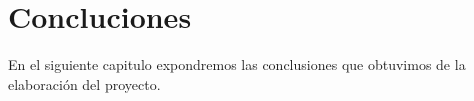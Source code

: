 \chapter{Concluciones}

En el siguiente capitulo expondremos las conclusiones que obtuvimos de la elaboración del proyecto.
